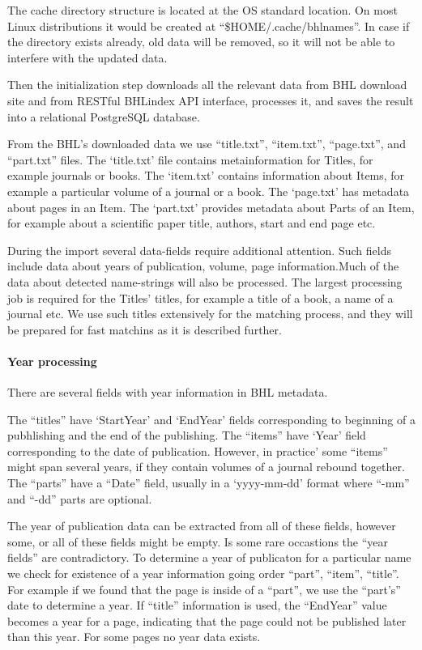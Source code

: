 \documentclass[
]{article}
\begin{document}
The cache directory structure is located at the OS standard location. On
most Linux distributions it would be created at
``\$HOME/.cache/bhlnames''. In case if the directory exists already, old
data will be removed, so it will not be able to interfere with the
updated data.

Then the initialization step downloads all the relevant data from BHL
download site and from RESTful BHLindex API interface, processes it, and
saves the result into a relational PostgreSQL database.

From the BHL's downloaded data we use ``title.txt'', ``item.txt'',
``page.txt'', and ``part.txt'' files. The `title.txt' file contains
metainformation for Titles, for example journals or books. The
`item.txt' contains information about Items, for example a particular
volume of a journal or a book. The `page.txt' has metadata about pages
in an Item. The `part.txt' provides metadata about Parts of an Item, for
example about a scientific paper title, authors, start and end page etc.

During the import several data-fields require additional attention. Such
fields include data about years of publication, volume, page
information.Much of the data about detected name-strings will also be
processed. The largest processing job is required for the Titles'
titles, for example a title of a book, a name of a journal etc. We use
such titles extensively for the matching process, and they will be
prepared for fast matchins as it is described further.

\hypertarget{year-processing}{%
\paragraph{Year processing}\label{year-processing}}

There are several fields with year information in BHL metadata.

The ``titles'' have `StartYear' and `EndYear' fields corresponding to
beginning of a pubhlishing and the end of the publishing. The ``items''
have `Year' field corresponding to the date of publication. However, in
practice' some ``items'' might span several years, if they contain
volumes of a journal rebound together. The ``parts'' have a ``Date''
field, usually in a `yyyy-mm-dd' format where ``-mm'' and ``-dd'' parts
are optional.

The year of publication data can be extracted from all of these fields,
however some, or all of these fields might be empty. Is some rare
occastions the ``year fields'' are contradictory. To determine a year of
publicaton for a particular name we check for existence of a year
information going order ``part'', ``item'', ``title''. For example if we
found that the page is inside of a ``part'', we use the ``part's'' date
to determine a year. If ``title'' information is used, the ``EndYear''
value becomes a year for a page, indicating that the page could not be
published later than this year. For some pages no year data exists.
\end{document}
